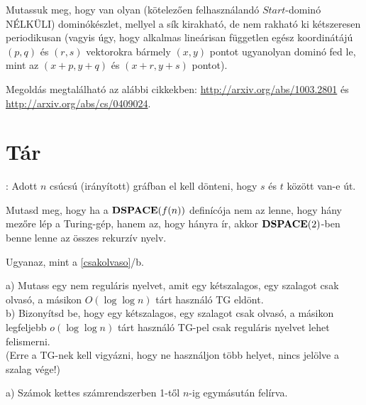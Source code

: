 \begin{Exercise}[counter={sorszam}, difficulty=2]
	Mutassuk meg, hogy van olyan (k\"otelez\H oen felhaszn\'aland\'o $Start$-domin\'o N\'ELK\"ULI) dominókészlet, mellyel a sík kirakható, de nem
	rakható ki kétszeresen periodikusan (vagyis úgy, hogy alkalmas lineárisan
	független egész koordinátájú $(p, q)$ és $(r, s)$ vektorokra bármely $(x,y)$
	pontot ugyanolyan dominó fed le, mint az $(x + p, y + q)$ és $(x + r, y +  s)$ pontot).
\end{Exercise}	
\begin{Answer}
	Megold\'as megtal\'alhat\'o az al\'abbi cikkekben: \url{http://arxiv.org/abs/1003.2801} \'es \url{http://arxiv.org/abs/cs/0409024}.
\end{Answer}




\chapter{T\'ar}

 {}: Adott $n$ cs\'ucs\'u (ir\'any\'itott) gr\'afban el kell d\"onteni, hogy $s$ \'es $t$ k\"oz\"ott van-e \'ut. 

\begin{Exercise}[counter={sorszam}, difficulty=1]
	Mutasd meg, hogy ha a $\mbox{\ensuremath{\mathbf{DSPACE}}}(f(n))$ defin\'ic\'oja nem az lenne, hogy h\'any mez\H ore l\'ep a Turing-g\'ep, hanem az, hogy h\'anyra \'ir, akkor $\mbox{\ensuremath{\mathbf{DSPACE}}}(2)$-ben benne lenne az \"osszes rekurz\'iv nyelv.
\end{Exercise}	
\begin{Answer}
	Ugyanaz, mint a \ref{csakolvaso}/b. 
\end{Answer}

\begin{Exercise}[counter={sorszam}, difficulty=1]
	a) Mutass egy nem regul\'aris nyelvet, amit egy kétszalagos, egy szalagot csak olvasó, a másikon $O(\log \log n)$ tárt használó TG eld\"ont.\\
	b) Bizonyítsd be, hogy egy kétszalagos, egy szalagot csak olvasó, a másikon legfeljebb $o(\log \log n)$ tárt használó TG-pel csak regul\'aris nyelvet lehet felismerni.\\
(Erre a TG-nek kell vigy\'azni, hogy ne haszn\'aljon t\"obb helyet, nincs jel\"olve a szalag v\'ege!)
\end{Exercise}	
\begin{Answer}
	a) Sz\'amok kettes sz\'amrendszerben 1-t\H ol $n$-ig egym\'asut\'an fel\'irva. 
\end{Answer}

